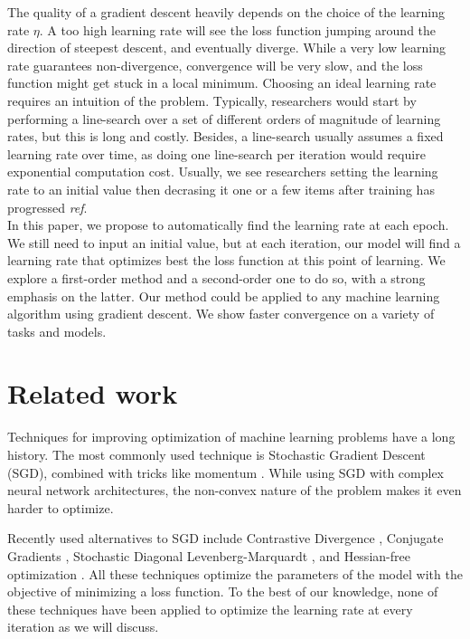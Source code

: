 \documentclass{article}
\begin{document}
  The quality of a gradient descent heavily depends on the choice of the learning rate $\eta$. A too high learning rate will see the loss function jumping around the direction of steepest descent, and eventually diverge. While a very low learning rate guarantees non-divergence, convergence will be very slow, and the loss function might get stuck in a local minimum. Choosing an ideal learning rate requires an intuition of the problem. Typically, researchers would start by performing a line-search over a set of different orders of magnitude of learning rates, but this is long and costly. Besides, a line-search usually assumes a fixed learning rate over time, as doing one line-search per iteration would require exponential computation cost. Usually, we see researchers setting the learning rate to an initial value then decrasing it one or a few items after training has progressed \emph{ref}.\\
  
  In this paper, we propose to automatically find the learning rate at each epoch. We still need to input an initial value, but at each iteration, our model will find a learning rate that optimizes best the loss function at this point of learning. We explore a first-order method and a second-order one to do so, with a strong emphasis on the latter. Our method could be applied to any machine learning algorithm using gradient descent. We show faster convergence on a variety of tasks and models. \\ 
  
  \section{Related work}
  
  Techniques for improving optimization of machine learning problems have a long history. The most commonly used technique is Stochastic Gradient Descent (SGD), combined with tricks like momentum \cite{polyak1964some}. While using SGD with complex neural network architectures, the non-convex nature of the problem makes it even harder to optimize. 
  
  Recently used alternatives to SGD include Contrastive Divergence \cite{hinton2006training}, Conjugate Gradients \cite{hinton2006reducing}, Stochastic Diagonal Levenberg-Marquardt \cite{lecun1998gradient}, and Hessian-free optimization \cite{martens2010deep}. All these techniques optimize the parameters of the model with the objective of minimizing a loss function. To the best of our knowledge, none of these techniques have been applied to optimize the learning rate at every iteration as we will discuss.
  
\end{document}
